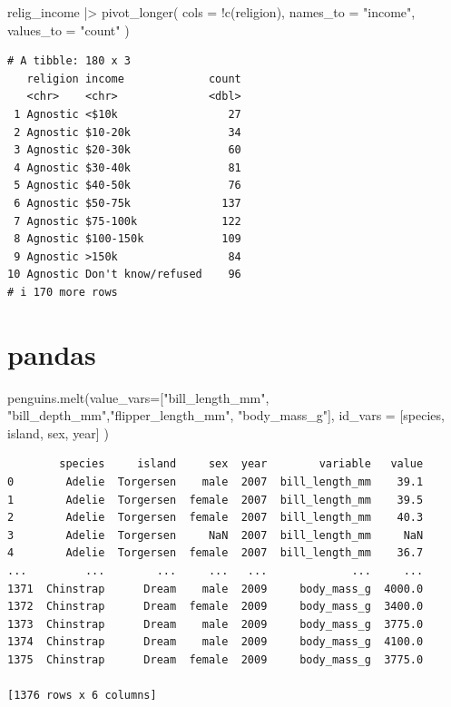\documentclass[
  letterpaper,
  DIV=11,
  numbers=noendperiod]{scrreprt}
\newenvironment{Shaded}{\begin{snugshade}}{\end{snugshade}}
\newcommand{\AttributeTok}[1]{\textcolor[rgb]{0.40,0.45,0.13}{#1}}
\newcommand{\FunctionTok}[1]{\textcolor[rgb]{0.28,0.35,0.67}{#1}}
\newcommand{\NormalTok}[1]{\textcolor[rgb]{0.00,0.23,0.31}{#1}}
\newcommand{\OperatorTok}[1]{\textcolor[rgb]{0.37,0.37,0.37}{#1}}
\newcommand{\SpecialCharTok}[1]{\textcolor[rgb]{0.37,0.37,0.37}{#1}}
\newcommand{\StringTok}[1]{\textcolor[rgb]{0.13,0.47,0.30}{#1}}
\begin{document}
\begin{Shaded}
\begin{Highlighting}[]
\NormalTok{relig\_income }\SpecialCharTok{|\textgreater{}}
    \FunctionTok{pivot\_longer}\NormalTok{(}
        \AttributeTok{cols =} \SpecialCharTok{!}\FunctionTok{c}\NormalTok{(religion),}
        \AttributeTok{names\_to =} \StringTok{"income"}\NormalTok{,}
        \AttributeTok{values\_to =} \StringTok{"count"}
\NormalTok{    )}
\end{Highlighting}
\end{Shaded}

\begin{verbatim}
# A tibble: 180 x 3
   religion income             count
   <chr>    <chr>              <dbl>
 1 Agnostic <$10k                 27
 2 Agnostic $10-20k               34
 3 Agnostic $20-30k               60
 4 Agnostic $30-40k               81
 5 Agnostic $40-50k               76
 6 Agnostic $50-75k              137
 7 Agnostic $75-100k             122
 8 Agnostic $100-150k            109
 9 Agnostic >150k                 84
10 Agnostic Don't know/refused    96
# i 170 more rows
\end{verbatim}

\section{pandas}

\begin{Shaded}
\begin{Highlighting}[]
\NormalTok{penguins.melt(value\_vars}\OperatorTok{=}\NormalTok{[}\StringTok{"bill\_length\_mm"}\NormalTok{, }\StringTok{"bill\_depth\_mm"}\NormalTok{,}\StringTok{"flipper\_length\_mm"}\NormalTok{, }\StringTok{"body\_mass\_g"}\NormalTok{],}
\NormalTok{              id\_vars }\OperatorTok{=}\NormalTok{ [}\StringTok{\textquotesingle{}species\textquotesingle{}}\NormalTok{, }\StringTok{\textquotesingle{}island\textquotesingle{}}\NormalTok{, }\StringTok{\textquotesingle{}sex\textquotesingle{}}\NormalTok{, }\StringTok{\textquotesingle{}year\textquotesingle{}}\NormalTok{]}
\NormalTok{              )}
\end{Highlighting}
\end{Shaded}

\begin{verbatim}
        species     island     sex  year        variable   value
0        Adelie  Torgersen    male  2007  bill_length_mm    39.1
1        Adelie  Torgersen  female  2007  bill_length_mm    39.5
2        Adelie  Torgersen  female  2007  bill_length_mm    40.3
3        Adelie  Torgersen     NaN  2007  bill_length_mm     NaN
4        Adelie  Torgersen  female  2007  bill_length_mm    36.7
...         ...        ...     ...   ...             ...     ...
1371  Chinstrap      Dream    male  2009     body_mass_g  4000.0
1372  Chinstrap      Dream  female  2009     body_mass_g  3400.0
1373  Chinstrap      Dream    male  2009     body_mass_g  3775.0
1374  Chinstrap      Dream    male  2009     body_mass_g  4100.0
1375  Chinstrap      Dream  female  2009     body_mass_g  3775.0

[1376 rows x 6 columns]
\end{verbatim}
\end{document}
